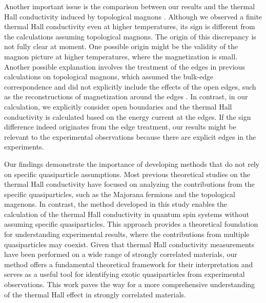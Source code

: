 \documentclass[twocolumn,superscriptaddress,showpacs, longbibliography, aps, prb]{revtex4-2}
\newcommand{\red}[1]{\textcolor{red}{#1}}
\newcommand{\blue}[1]{\textcolor{blue}{#1}}
\newcommand{\orange}[1]{\textcolor{orange}{#1}}
\begin{document}

Another important issue is the comparison %
between our results and the thermal Hall conductivity induced by topological magnons \cite{McClarty_PRB2018, Joshi_PRB2018, ChernZK2021}. 
Although we observed a finite thermal Hall conductivity even at 
higher temperatures, its sign is different from the calculations assuming topological magnons. The origin of this discrepancy is not fully clear at %
moment. One possible origin might be the validity of the magnon picture at higher temperatures, where %
the magnetization is small.
Another %
possible explanation involves
the treatment of the edges in %
previous calculations %
on topological magnons, %
which assumed the bulk-edge correspondence and did not explicitly include the effects of the open edges, such as the reconstructions of magnetization around the edges \cite{KoyamaN2023,HabelMWK2024}.
In contrast, in our calculation, we explicitly consider open boundaries and the thermal Hall conductivity is calculated %
based on the energy current at the edges. If the sign difference %
indeed originates from the edge treatment, our results might be relevant to the experimental observations because there are explicit edges in the experiments.

Our findings %
demonstrate the importance of developing methods that do not rely on specific quasiparticle assumptions. Most previous theoretical studies on the thermal Hall conductivity have focused on analyzing the contributions from the specific quasiparticles, such as the Majorana fermions and the topological magenons. In contrast, the method developed in this study enables the calculation of the thermal Hall conductivity in quantum spin systems without assuming specific quasiparticles. This approach provides a theoretical foundation for understanding experimental results, where the contributions from multiple quasiparticles may coexist. Given that thermal Hall conductivity measurements have been performed on a wide range of strongly correlated materials, our method offers a fundamental theoretical framework for their interpretation and serves as a useful tool for identifying exotic quasiparticles from experimental observations. This work paves the way for a more comprehensive understanding of the thermal Hall effect in strongly correlated materials.
\end{document}
